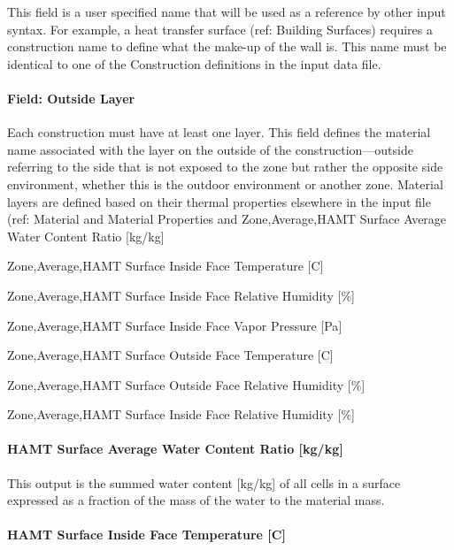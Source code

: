 This field is a user specified name that will be used as a reference by other input syntax. For example, a heat transfer surface (ref: Building Surfaces) requires a construction name to define what the make-up of the wall is. This name must be identical to one of the Construction definitions in the input data file.

\paragraph{Field: Outside Layer}\label{field-outside-layer}

Each construction must have at least one layer. This field defines the material name associated with the layer on the outside of the construction---outside referring to the side that is not exposed to the zone but rather the opposite side environment, whether this is the outdoor environment or another zone. Material layers are defined based on their thermal properties elsewhere in the input file (ref: Material and Material Properties and Zone,Average,HAMT Surface Average Water Content Ratio {[}kg/kg{]}

Zone,Average,HAMT Surface Inside Face Temperature {[}C{]}

Zone,Average,HAMT Surface Inside Face Relative Humidity {[}\%{]}

Zone,Average,HAMT Surface Inside Face Vapor Pressure {[}Pa{]}

Zone,Average,HAMT Surface Outside Face Temperature {[}C{]}

Zone,Average,HAMT Surface Outside Face Relative Humidity {[}\%{]}

Zone,Average,HAMT Surface Inside Face Relative Humidity {[}\%{]}

\paragraph{HAMT Surface Average Water Content Ratio {[}kg/kg{]}}\label{hamt-surface-average-water-content-ratio-kgkg-1}

This output is the summed water content {[}kg/kg{]} of all cells in a surface expressed as a fraction of the mass of the water to the material mass.

\paragraph{HAMT Surface Inside Face Temperature {[}C{]}}\label{hamt-surface-inside-face-temperature-c-1}

